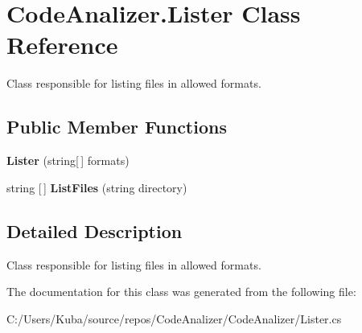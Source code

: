 \hypertarget{class_code_analizer_1_1_lister}{}\section{Code\+Analizer.\+Lister Class Reference}
\label{class_code_analizer_1_1_lister}


Class responsible for listing files in allowed formats.  


\subsection*{Public Member Functions}
\begin{DoxyCompactItemize}
\item 
\mbox{\label{class_code_analizer_1_1_lister_ab3078685b3043561e14a0f7225ecb602}} 
{\bfseries Lister} (string\mbox{[}$\,$\mbox{]} formats)
\item 
\mbox{\label{class_code_analizer_1_1_lister_ad7e61fa677a8ca1fff7462832823144d}} 
string \mbox{[}$\,$\mbox{]} {\bfseries List\+Files} (string directory)
\end{DoxyCompactItemize}


\subsection{Detailed Description}
Class responsible for listing files in allowed formats. 



The documentation for this class was generated from the following file\+:\begin{DoxyCompactItemize}
\item 
C\+:/\+Users/\+Kuba/source/repos/\+Code\+Analizer/\+Code\+Analizer/Lister.\+cs\end{DoxyCompactItemize}
